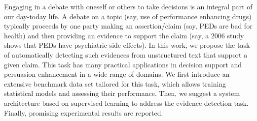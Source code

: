 Engaging in a debate with oneself or others to take decisions is an integral part of our day-today life. A debate on a topic (say, use of performance enhancing drugs) typically proceeds by one party making an assertion/claim (say, PEDs are bad for health) and then providing an evidence to support the claim (say, a 2006 study shows that PEDs have psychiatric side effects). In this work, we propose the task of automatically detecting such evidences from unstructured text that support a given claim. This task has many practical applications in decision support and persuasion enhancement in a wide range of domains. We first introduce an extensive benchmark data set tailored for this task, which allows training statistical models and assessing their performance. Then, we suggest a system architecture based on supervised learning to address the evidence detection task. Finally, promising experimental results are reported.
